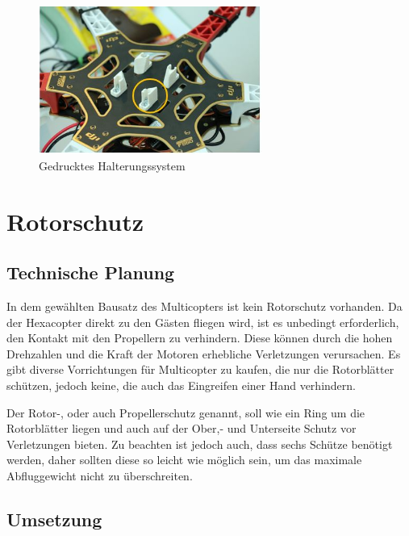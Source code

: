 			\begin{figure}[tbh]
			\begin{centering}
			\includegraphics[width = 0.65\textwidth]{Bilder/halterung_cupcake_fertig_hinweis}
			\par\end{centering}
			\caption{Gedrucktes Halterungssystem}
			\label{halterung_cupcake_fertig_hinweis}
			\end{figure}

			\newpage

\section{Rotorschutz}

	\subsection{Technische Planung}

	In dem gewählten Bausatz des Multicopters ist kein Rotorschutz vorhanden.
	Da der Hexacopter direkt zu den Gästen fliegen wird, ist es unbedingt erforderlich, den Kontakt mit den Propellern zu verhindern.
	Diese können durch die hohen Drehzahlen und die Kraft der Motoren erhebliche Verletzungen verursachen.
	Es gibt diverse Vorrichtungen für Multicopter zu kaufen, die nur die Rotorblätter schützen, jedoch keine, die auch das Eingreifen einer Hand verhindern.

	Der Rotor-, oder auch Propellerschutz genannt, soll wie ein Ring um die Rotorblätter liegen und auch auf der Ober,- und Unterseite Schutz vor Verletzungen bieten.
	Zu beachten ist jedoch auch, dass sechs Schütze benötigt werden, daher sollten diese so leicht wie möglich sein, um das maximale Abfluggewicht nicht zu überschreiten.

	\subsection{Umsetzung}

